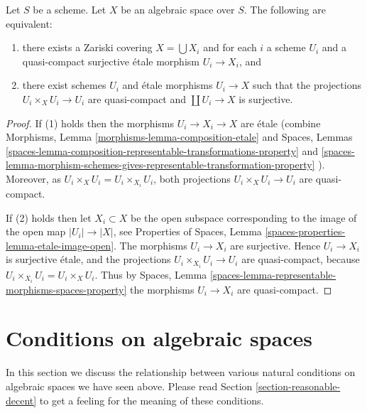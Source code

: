 \begin{lemma}
\label{lemma-characterize-very-reasonable}
Let $S$ be a scheme.
Let $X$ be an algebraic space over $S$.
The following are equivalent:
\begin{enumerate}
\item there exists a Zariski covering $X = \bigcup X_i$ and for
each $i$ a scheme $U_i$ and a quasi-compact surjective \'etale
morphism $U_i \to X_i$, and
\item there exist schemes $U_i$ and \'etale morphisms $U_i \to X$
such that the projections $U_i \times_X U_i \to U_i$ are quasi-compact
and $\coprod U_i \to X$ is surjective.
\end{enumerate}
\end{lemma}

\begin{proof}
If (1) holds then the morphisms $U_i \to X_i \to X$ are \'etale (combine
Morphisms, Lemma \ref{morphisms-lemma-composition-etale}
and
Spaces, Lemmas
\ref{spaces-lemma-composition-representable-transformations-property} and
\ref{spaces-lemma-morphism-schemes-gives-representable-transformation-property}
).
Moreover, as $U_i \times_X U_i = U_i \times_{X_i} U_i$,
both projections $U_i \times_X U_i \to U_i$ are quasi-compact.

\medskip\noindent
If (2) holds then let $X_i \subset X$ be the open subspace corresponding
to the image of the open map $|U_i| \to |X|$, see
Properties of Spaces,
Lemma \ref{spaces-properties-lemma-etale-image-open}.
The morphisms $U_i \to X_i$ are surjective.
Hence $U_i \to X_i$ is surjective \'etale, and the projections
$U_i \times_{X_i} U_i \to U_i$ are quasi-compact, because
$U_i \times_{X_i} U_i = U_i \times_X U_i$. Thus by
Spaces, Lemma \ref{spaces-lemma-representable-morphisms-spaces-property}
the morphisms $U_i \to X_i$ are quasi-compact.
\end{proof}









\section{Conditions on algebraic spaces}
\label{section-conditions}

\noindent
In this section we discuss the relationship between various natural
conditions on algebraic spaces we have seen above. Please read
Section \ref{section-reasonable-decent}
to get a feeling for the meaning of these conditions.

